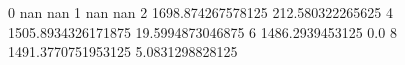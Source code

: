 0 nan nan
1 nan nan
2 1698.874267578125 212.580322265625
4 1505.8934326171875 19.5994873046875
6 1486.2939453125 0.0
8 1491.3770751953125 5.0831298828125
